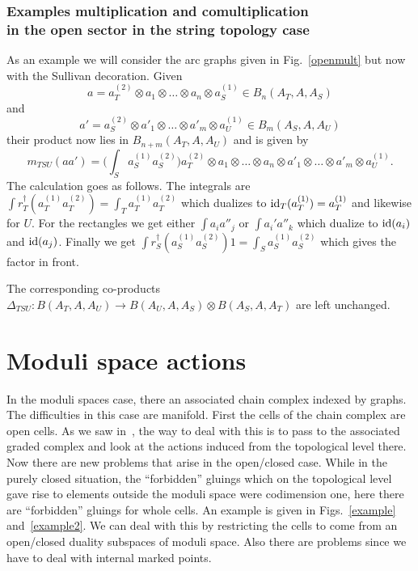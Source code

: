 \documentclass[pdftex]{sigma}
\def\oto{\otimes \dots \otimes}
\begin{document}
\subsubsection{Examples multiplication and comultiplication\\ in the  open sector in the string topology case}
\label{sullexpar}

As an example we will consider the arc graphs given in Fig.~\ref{openmult} but now with the Sullivan decoration.
Given
\[
a=a^{(2)}_T\otimes a_1\oto a_n\otimes a^{(1)}_S\in B_n(A_T,A,A_S)
\]
and
\[
a'=a_S^{(2)}\otimes a'_1\oto a'_m\otimes a^{(1)}_U\in
B_m(A_S,A,A_U)
\]
 their product now lies
in $B_{n+m}(A_T,A,A_U)$ and is given by
\begin{equation*}
m_{TSU}(aa') = \bigg(\int_Sa^{(1)}_Sa^{(2)}_S\bigg)  a_T^{(2)}\otimes a_1\oto a_n \otimes a'_1\oto a'_m\otimes a^{(1)}_U.
\end{equation*}
The calculation goes as follows. The integrals are $\int
r^{\dagger}_T (a^{(1)}_T a^{(2)}_T)=\int_T a^{(1)}_T a^{(2)}_T$
which dualizes to ${\rm id}_T(a_T^{(1)})=a_T^{(1)}$ and likewise for $U$.
For the rectangles we get either $\int a_i a''_j$ or $\int a_i'
a''_k$ which dualize to ${\rm id}(a_i)$ and ${\rm id}(a_j)$. Finally we get
$\int r_S^{\dagger}(a_S^{(1)}a_S^{(2)})1=\int_S a^{(1)}_Sa^{(2)}_S$
which gives the factor in front.

The corresponding  co-products  $\Delta_{TSU}: B(A_T,A,A_U)\to B(A_U,A,A_S) \otimes B(A_S,A,A_T)$ are left unchanged.


\section{Moduli space actions}
\label{modulisection}

In the moduli spaces case, there an associated chain complex indexed
by graphs. The dif\/f\/iculties in this case are manifold. First the
cells of the chain complex are open cells. As we saw in~\cite{hoch1,hoch2}, the way to deal with this is to pass to the
associated graded complex and look at the actions induced from the
topological level there. Now there are new problems that arise in
the open/closed case. While in the purely closed situation, the
``forbidden'' gluings which on the topological level gave rise to
elements outside the moduli space were codimension one, here there
are ``forbidden'' gluings for whole cells. An example is given in
Figs.~\ref{example} and~\ref{example2}. We can deal with this by
restricting the cells to come from an open/closed duality subspaces
of moduli space. Also there are problems since we have to deal with
internal marked points.
\end{document}
